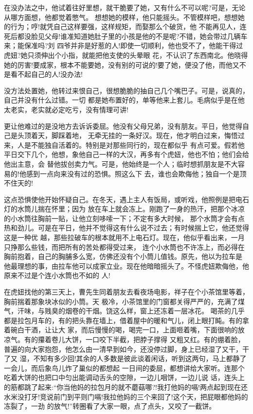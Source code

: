 \documentclass[11pt,a4paper,onecolumn]{article}
\begin{document}
在没办法之中，他试着往好里想，就干脆要了她，又有什么不可以呢?可是，无论从哪方面想，他都觉着憋气。
想想她的模样，他只能摇头。不管模样吧，想想她的行为；哼!就凭自己这样要强，这样规矩，而娶那么个破货，他
不能再见人，连死后都没脸见父母!谁准知道她肚子里的小孩是他的不是呢?不错，她会带过几辆车来；能保准吗?刘
四爷并非是好惹的人!即使一切顺利，他也受不了，他能干得过虎妞?她只须伸出个小指，就能把他支使的头晕眼
花，不认识了东西南北。他晓得她的厉害!要成家，根本不能要她，没有别的可说的!要了她，便没了他，而他又不
是看不起自己的人!没办法!

没方法处置她，他转过来恨自己，很想脆脆的抽自己几个嘴巴子。可是，说真的，自己并没有什么过错。一切
都是她布置好的，单等他来上套儿。毛病似乎是在他太老实，老实就必定吃亏，没有情理可讲!

更让他难过的是没地方去诉诉委屈。他没有父母兄弟，没有朋友。平日，他觉得自己是头顶着天，脚踩着地，
无牵无挂的一条好汉。现在，他才明白过来，悔悟过来，人是不能独自活着的。特别是对那些同行的，现在都似乎
有点可爱。假若他平日交下几个，他想，象他自己一样的大汉，再多有个虎妞，他也不怕；他们会给他出主意，会
替他拔创卖力气。可是，他始终是一个人；临时想抓朋友是不大容易的!他感到一点向来没有过的恐惧。照这么下
去，谁也会欺侮他；独自一个是顶不住天的!

这点恐惧使他开始怀疑自己。在冬天，遇上主人有饭局，或听戏，他照例是把电石灯的水筒儿揣在怀里；因为
放在车上就会冻上。刚跑了一身的热汗，把那个冰凉的小水筒往胸前一贴，让他立刻哆嗦一下；不定有多大时候，
那个水筒才会有点热和劲儿。可是在平日，他并不觉得这有什么说不过去；有时候揣上它，他还觉得这是一种优
越，那些拉破车的根本就用不上电石灯。现在，他似乎看出来，一月只挣那么些钱，而把所有的苦处都得受过来，
连个小水筒也不许冻上，而必得在胸前抱着，自己的胸脯多么宽，仿佛还没有个小筒儿值钱。原先，他以为拉车是
他最理想的事，由拉车他可以成家立业。现在他暗暗摇头了。不怪虎妞欺侮他，他原来不过是个连小水筒也不如的
人!

在虎妞找他的第三天上，曹先生同着朋友去看夜场电影，祥子在个小茶馆里等着，胸前揣着那象块冰似的小筒。天
极冷，小茶馆里的门窗都关得严严的，充满了煤气，汗味，与贱臭的烟卷的干烟。饶这么样，窗上还冻着一层冰花。
喝茶的几乎都是拉包月车的，有的把头靠在墙上，借着屋中的暖和气儿，闭上眼打盹。有的拿着碗白干酒，让让大
家，而后慢慢的喝，喝完一口，上面咂着嘴，下面很响的放凉气。有的攥着卷儿大饼，一口咬下半截，把脖子撑得
又粗又红。有的绷着脸，普遍的向大家抱怨，他怎么由一清早到如今，还没停过脚，身上已经湿了又干，干了又
湿，不知有多少回!其余的人多数是彼此谈着闲话，听到这两句，马上都静了一会儿，而后象鸟儿炸了巢似的都想起
一日间的委屈，都想讲给大家听。连那个吃着大饼的也把口中匀出能调动舌头的空隙，一边儿咽饼，一边儿说
话，连头上的筋都跳了起来:``你当他妈的拉包月的就不蘑菇哪?!我打他妈的\myrule 嗝!\myrule 两点起到现在还
水米没打牙!竞说前门到平则门\myrule 嗝!\myrule 我拉他妈的三个来回了!这个天，把屁眼都他妈的冻裂了，一劲
的放气!''转圈看了大家一眼，点了点头，又咬了一截饼。
\end{document}
